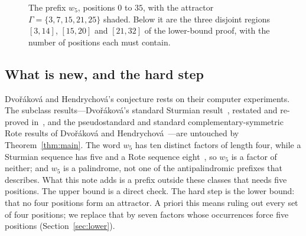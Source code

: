 \documentclass[11pt]{article}
\theoremstyle{remark}
\begin{document}
\begin{figure}[ht]
\centering
{}
\caption{The prefix $w_5$, positions $0$ to $35$, with the attractor
$\Gamma=\{3,7,15,21,25\}$ shaded. Below it are the three disjoint regions
$[3,14]$, $[15,20]$ and $[21,32]$ of the lower-bound proof, with the number
of positions each must contain.}
\label{fig:word}
\end{figure}

\subsection*{What is new, and the hard step}
Dvořáková and Hendrychová's conjecture rests on their computer experiments.
The subclass results---Dvořáková's standard Sturmian
result~\cite{d-epi}, restated and re-proved in~\cite{dh}, and the
pseudostandard and standard complementary-symmetric Rote results of
Dvořáková and Hendrychová~\cite{dh}---are untouched by Theorem~\ref{thm:main}. The word $w_5$ has ten distinct factors of length four,
while a Sturmian sequence has five and a Rote sequence eight~\cite{rote}, so
$w_5$ is a factor of neither; and $w_5$ is a palindrome, not one of the
antipalindromic prefixes that \cite[Theorem~8]{dh} describes. What this note
adds is a prefix outside these classes that needs five positions. The upper bound is a
direct check. The hard step is the lower bound: that no four positions form an
attractor. A priori this means ruling out every set of four positions; we
replace that by seven factors whose occurrences force five positions
(Section~\ref{sec:lower}).
\end{document}
